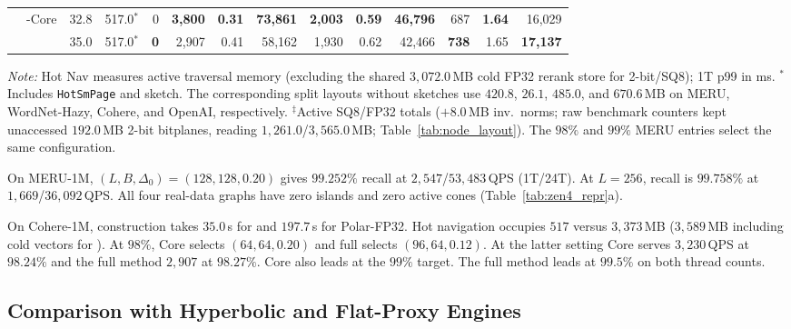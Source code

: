 \begin{table}[t]
\begin{tabular*}{\linewidth}{@{\extracolsep{\fill}}llrrrrrrrrrrrr@{}}
     & \rquiver{}-Core & 32.8 & 517.0$^*$ & 0 & \textbf{3,800} & \textbf{0.31} & \textbf{73,861} & \textbf{2,003} & \textbf{0.59} & \textbf{46,796} & 687 & \textbf{1.64} & 16,029 \\
     & \textbf{\rquiver{}} & 35.0 & 517.0$^*$ & \textbf{0} & 2,907 & 0.41 & 58,162 & 1,930 & 0.62 & 42,466 & \textbf{738} & 1.65 & \textbf{17,137} \\
    \bottomrule
  \end{tabular*}
  \par\vspace{1pt}
  {\scriptsize \textit{Note:} Hot Nav measures active traversal memory (excluding the shared $3{,}072.0$\,MB cold FP32 rerank store for 2-bit/SQ8); 1T p99 in ms. $^*$Includes \texttt{HotSmPage} and sketch. The corresponding split layouts without sketches use $420.8$, $26.1$, $485.0$, and $670.6$\,MB on MERU, WordNet-Hazy, Cohere, and OpenAI, respectively. $^\ddagger$Active SQ8/FP32 totals ($+8.0$\,MB inv.\ norms; raw benchmark counters kept unaccessed $192.0$\,MB 2-bit bitplanes, reading $1{,}261.0$/$3{,}565.0$\,MB; Table~\ref{tab:node_layout}). The $98\%$ and $99\%$ MERU entries select the same configuration.}
\end{table}

On {MERU-1M}, $(L,B,\Delta_0)=(128,128,0.20)$ gives $99.252\%$ recall at $2{,}547$/$53{,}483$\,QPS (1T/24T). At $L=256$, recall is $99.758\%$ at $1{,}669$/$36{,}092$\,QPS. All four real-data graphs have zero islands and zero active cones (Table~\ref{tab:zen4_repr}a).

On {Cohere-1M}, construction takes $35.0$\,s for \rquiver{} and $197.7$\,s for Polar-FP32. Hot navigation occupies $517$ versus $3{,}373$\,MB ($3{,}589$\,MB including cold vectors for \rquiver{}). At $98\%$, Core selects $(64,64,0.20)$ and full \rquiver{} selects $(96,64,0.12)$. At the latter setting Core serves $3{,}230$\,QPS at $98.24\%$ and the full method $2{,}907$ at $98.27\%$. Core also leads at the $99\%$ target. The full method leads at $99.5\%$ on both thread counts.

\subsection{Comparison with Hyperbolic and Flat-Proxy Engines}
\label{subsec:eval_external}

